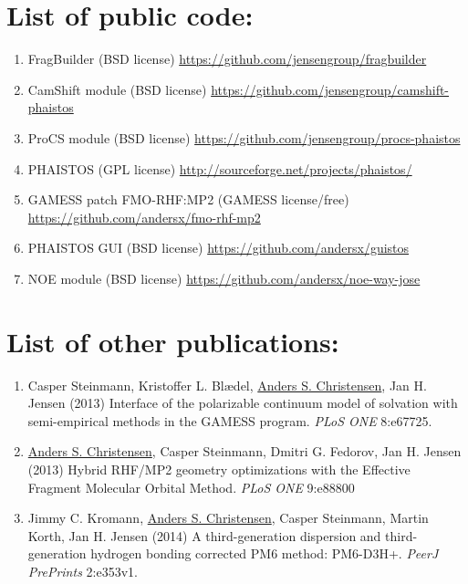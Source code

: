 \section*{List of public code:}
\begin{enumerate}
    \item FragBuilder (BSD license) \url{https://github.com/jensengroup/fragbuilder}
    \item CamShift module (BSD license) \url{https://github.com/jensengroup/camshift-phaistos}
    \item ProCS module (BSD license) \url{https://github.com/jensengroup/procs-phaistos}
    \item PHAISTOS (GPL license) \url{http://sourceforge.net/projects/phaistos/}
    \item GAMESS patch FMO-RHF:MP2 (GAMESS license/free) \url{https://github.com/andersx/fmo-rhf-mp2}
    \item PHAISTOS GUI (BSD license) \url{https://github.com/andersx/guistos}
    \item NOE module (BSD license) \url{https://github.com/andersx/noe-way-jose}
\end{enumerate}
\clearpage
\section*{List of other publications:}
\begin{enumerate}
    \item Casper Steinmann, Kristoffer L. Blædel, \underline{Anders S. Christensen}, Jan H. Jensen (2013) Interface of the polarizable continuum model of solvation with semi-empirical methods in the GAMESS program. \textit{PLoS ONE} 8:e67725.
    \item \underline{Anders S. Christensen}, Casper Steinmann, Dmitri G. Fedorov, Jan H. Jensen (2013) Hybrid RHF/MP2 geometry optimizations with the Effective Fragment Molecular Orbital Method. \textit{PLoS ONE} 9:e88800
    \item Jimmy C. Kromann, \underline{Anders S. Christensen}, Casper Steinmann, Martin Korth, Jan H. Jensen (2014) A third-generation dispersion and third-generation hydrogen bonding corrected PM6 method: PM6-D3H+. \textit{PeerJ PrePrints} 2:e353v1.
\end{enumerate}

